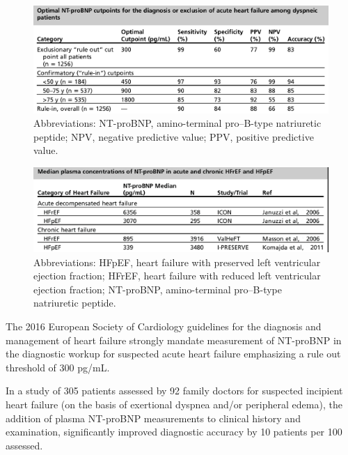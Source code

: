 \documentclass[14pt,a4paper,onecolumn]{extarticle}
\begin{document}
\begin{figure}   \includegraphics{../../images/NTBNP_cutpoints.png}   \caption{Abbreviations: NT-proBNP, amino-terminal pro–B-type natriuretic peptide; NPV, negative predictive value; PPV, positive predictive value.\citep{Januzzi2006a}}   \label{NTBNP_cutpoints} \end{figure}

\begin{figure}   \includegraphics{../../images/NTBNP_HF.png}   \caption{Abbreviations: HFpEF, heart failure with preserved left ventricular ejection fraction; HFrEF, heart failure with reduced left ventricular ejection fraction; NT-proBNP, amino-terminal pro–B-type natriuretic peptide. \citep{Richards2018}}   \label{NTBNP_HF} \end{figure}

The 2016 European Society of Cardiology guidelines for the diagnosis and management of heart failure strongly mandate measurement of NT-proBNP in the diagnostic workup for suspected acute heart failure emphasizing a rule out threshold of 300 pg/mL. \citep{Ponikowski2016}

In a study of 305 patients assessed by 92 family doctors for suspected incipient heart failure (on the basis of exertional dyspnea and/or peripheral edema), the addition of plasma NT-proBNP measurements to clinical history and examination, significantly improved diagnostic accuracy by 10 patients per 100 assessed. \citep{bib3133}

\end{document}
